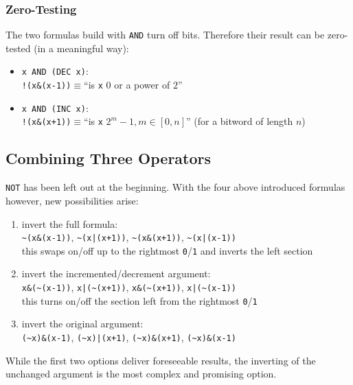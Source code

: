 \subsubsection*{Zero-Testing}
The two formulas build with \lstinline$AND$ turn off bits.
Therefore their result can be zero-tested (in a meaningful way):
\begin{itemize}
\item \lstinline$x AND (DEC x)$:\\
    \lstinline$!(x&(x-1))$$\equiv$``is \lstinline$x$ $0$ or a power of $2$''
\item \lstinline$x AND (INC x)$:\\
    \lstinline$!(x&(x+1))$$\equiv$``is \lstinline$x$ $2^m - 1, m \in [0,n]$''
    (for a bitword of length $n$)
\end{itemize}


\subsection*{Combining Three Operators}

\lstinline$NOT$ has been left out at the beginning.
With the four above introduced formulas however, new possibilities arise:
\begin{enumerate}
\item invert the full formula:\\
    \lstinline$~(x&(x-1))$, \lstinline$~(x|(x+1))$,
    \lstinline$~(x&(x+1))$, \lstinline$~(x|(x-1))$\\
    this swaps on/off up to the rightmost \lstinline$0$/\lstinline$1$
    and inverts the left section
\item invert the incremented/decrement argument:\\
    \lstinline$x&(~(x-1))$, \lstinline$x|(~(x+1))$,
    \lstinline$x&(~(x+1))$, \lstinline$x|(~(x-1))$\\
    this turns on/off the section
    left from the rightmost \lstinline$0$/\lstinline$1$
\item invert the original argument:\\
    \lstinline$(~x)&(x-1)$, \lstinline$(~x)|(x+1)$,
    \lstinline$(~x)&(x+1)$, \lstinline$(~x)&(x-1)$\\
\end{enumerate}

While the first two options deliver foreseeable results,
the inverting of the unchanged argument is the most complex
and promising option.

